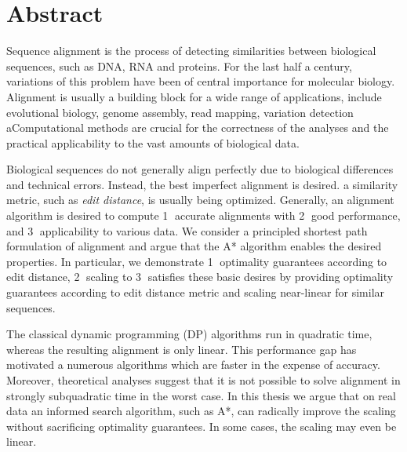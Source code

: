 \begingroup
\let\clearpage\relax
\let\cleardoublepage\relax
\let\cleardoublepage\relax

\chapter*{Abstract}

Sequence alignment is the process of detecting similarities between biological
sequences, such as DNA, RNA and proteins. For the last half a century,
variations of this problem have been of central importance for molecular
biology. Alignment is usually a building block for a wide range of applications,
include evolutional biology, genome assembly, read mapping, variation detection
aComputational methods are crucial for the correctness of the analyses and the
practical applicability to the vast amounts of biological data.

Biological sequences do not generally align perfectly due to biological
differences and technical errors. Instead, the best imperfect alignment is
desired. a similarity metric, such as \emph{edit distance}, is usually being
optimized. Generally, an alignment algorithm is desired to compute
\textcircled{1} accurate alignments with \textcircled{2}  good performance, and
\textcircled{3} applicability to various data. We consider a principled shortest
path formulation of alignment and argue that the A* algorithm enables the
desired properties. In particular, we demonstrate \textcircled{1} optimality
guarantees according to edit distance, \textcircled{2} scaling to
\textcircled{3} satisfies these basic desires by providing optimality guarantees
according to edit distance metric and scaling near-linear for similar sequences.


The classical dynamic programming (DP) algorithms run in quadratic time, whereas
the resulting alignment is only linear. This performance gap has motivated a
numerous algorithms which are faster in the expense of accuracy. Moreover,
theoretical analyses suggest that it is not possible to solve alignment in
strongly subquadratic time in the worst case. In this thesis we argue that on
real data an informed search algorithm, such as A*, can radically improve the scaling
without sacrificing optimality guarantees. In some cases, the scaling may even
be linear.


